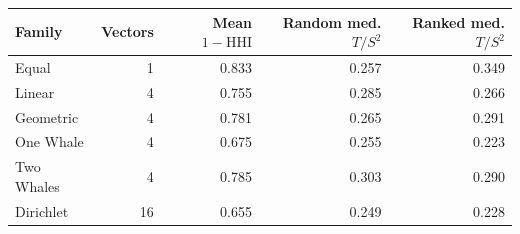 \begin{tabular}{lrrrr}
\toprule
Family & Vectors & Mean $1-\mathrm{HHI}$ & Random med. $T/S^2$ & Ranked med. $T/S^2$ \\
\midrule
Equal & 1 & 0.833 & 0.257 & 0.349 \\
Linear & 4 & 0.755 & 0.285 & 0.266 \\
Geometric & 4 & 0.781 & 0.265 & 0.291 \\
One Whale & 4 & 0.675 & 0.255 & 0.223 \\
Two Whales & 4 & 0.785 & 0.303 & 0.290 \\
Dirichlet & 16 & 0.655 & 0.249 & 0.228 \\
\bottomrule
\end{tabular}
